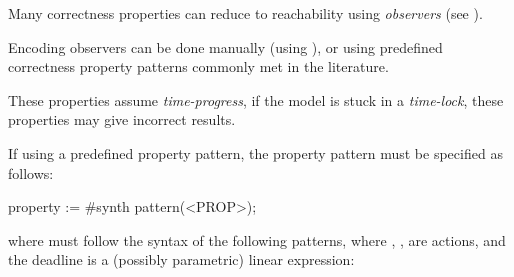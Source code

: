 Many correctness properties can reduce to reachability using \emph{observers} (see \cite{ABL98,ABBL98,ABBL03,Andre13ICECCS}).

Encoding observers can be done manually (using \adhoc{} \IPTA{}), or using predefined correctness property patterns commonly met in the literature.

\begin{becareful}
	These properties assume \emph{time-progress}, \ie{} if the model is stuck in a \emph{time-lock}, these properties may give incorrect results.
\end{becareful}

%
%
%
%
%



If using a predefined property pattern, the property pattern must be specified as follows:

\begin{IMITATORproperty}
property := #synth pattern(<PROP>);
\end{IMITATORproperty}

\noindent{}where  must follow the syntax of the following patterns, where , ,  are actions, and the deadline  is a (possibly parametric) linear expression:

